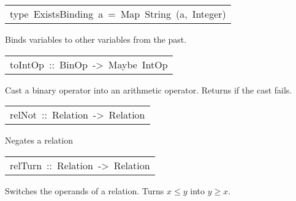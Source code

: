 \begin{haddockdesc}
\item[\begin{tabular}{@{}l}
type\ ExistsBinding\ a\ =\ Map\ String\ (a,\ Integer)
\end{tabular}]\haddockbegindoc
Binds variables to other variables from the past.
\par

\end{haddockdesc}
\begin{haddockdesc}
\item[\begin{tabular}{@{}l}
toIntOp\ ::\ BinOp\ ->\ Maybe\ IntOp
\end{tabular}]\haddockbegindoc
Cast a binary operator into an arithmetic operator. Returns  if the cast fails.
\par

\end{haddockdesc}
\begin{haddockdesc}
\item[\begin{tabular}{@{}l}
relNot\ ::\ Relation\ ->\ Relation
\end{tabular}]\haddockbegindoc
Negates a relation
\par

\end{haddockdesc}
\begin{haddockdesc}
\item[\begin{tabular}{@{}l}
relTurn\ ::\ Relation\ ->\ Relation
\end{tabular}]\haddockbegindoc
Switches the operands of a relation.
   Turns $x\leq y$ into $y\geq x$.
\par

\end{haddockdesc}